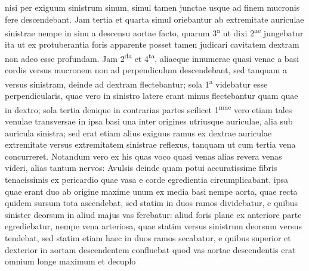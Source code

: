 nisi per exiguum sinistrum sinum, simul tamen junctae usque ad finem mucronis fere descendebant. Jam tertia et quarta simul oriebantur ab extremitate auriculae sinistrae nempe in sinu a descensu aortae facto, quarum 3\textsuperscript{a} ut dixi 2\textsuperscript{ae} jungebatur ita ut ex protuberantia foris apparente posset tamen judicari cavitatem dextram non adeo esse profundam. Jam 2\textsuperscript{da} et 4\textsuperscript{ta}, aliaeque innumerae quasi venae a basi cordis versus mucronem non ad perpendiculum descendebant, sed tanquam a  versus sinistram, deinde ad dextram flectebantur; sola 1\textsuperscript{a} videbatur esse perpendicularis, quae vero in sinistro latere erant minus flectebantur quam quae in dextro; sola tertia denique in contrarias partes
 scilicet 1\textsuperscript{mae}
vero etiam tales venulae transversae in ipsa basi una inter origines utriusque auriculae, alia sub auricula sinistra; sed erat etiam alius exiguus ramus ex dextrae auriculae extremitate versus extremitatem sinistrae reflexus, tanquam ut cum tertia vena concurreret. Notandum vero ex his quas voco quasi venas alias revera venas videri, alias tantum
nervos: Avulsis deinde quam potui accuratissime fibris tenacissimis ex pericardio quae vasa e corde egredientia circumplicabant, ipsa
quae erant duo ab origine maxime unum ex media basi nempe aorta, quae recta quidem sursum tota ascendebat, sed statim in duos ramos dividebatur, e quibus sinister deorsum in aliud majus vas ferebatur: aliud foris plane ex anteriore
parte egrediebatur, nempe vena arteriosa, quae statim versus sinistrum deorsum versus tendebat, sed statim etiam haec in duos ramos secabatur, e quibus superior et dexterior in aortam descendentem confluebat quod vas aortae descendentis erat omnium longe maximum et decuplo
